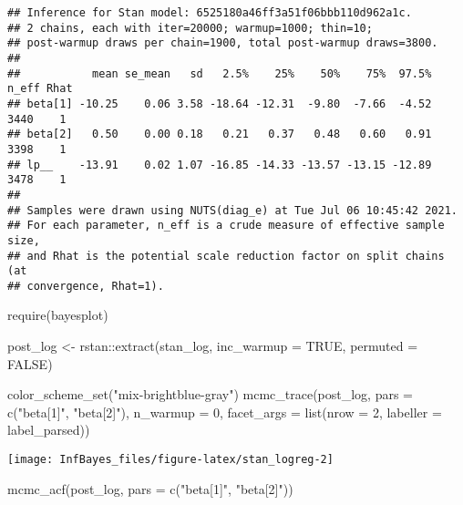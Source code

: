 \documentclass[
]{book}
\newenvironment{Shaded}{\begin{snugshade}}{\end{snugshade}}
\newcommand{\AttributeTok}[1]{\textcolor[rgb]{0.77,0.63,0.00}{#1}}
\newcommand{\ConstantTok}[1]{\textcolor[rgb]{0.00,0.00,0.00}{#1}}
\newcommand{\DecValTok}[1]{\textcolor[rgb]{0.00,0.00,0.81}{#1}}
\newcommand{\FunctionTok}[1]{\textcolor[rgb]{0.00,0.00,0.00}{#1}}
\newcommand{\NormalTok}[1]{#1}
\newcommand{\OtherTok}[1]{\textcolor[rgb]{0.56,0.35,0.01}{#1}}
\newcommand{\SpecialCharTok}[1]{\textcolor[rgb]{0.00,0.00,0.00}{#1}}
\newcommand{\StringTok}[1]{\textcolor[rgb]{0.31,0.60,0.02}{#1}}
\begin{document}
\begin{verbatim}
## Inference for Stan model: 6525180a46ff3a51f06bbb110d962a1c.
## 2 chains, each with iter=20000; warmup=1000; thin=10; 
## post-warmup draws per chain=1900, total post-warmup draws=3800.
## 
##           mean se_mean   sd   2.5%    25%    50%    75%  97.5% n_eff Rhat
## beta[1] -10.25    0.06 3.58 -18.64 -12.31  -9.80  -7.66  -4.52  3440    1
## beta[2]   0.50    0.00 0.18   0.21   0.37   0.48   0.60   0.91  3398    1
## lp__    -13.91    0.02 1.07 -16.85 -14.33 -13.57 -13.15 -12.89  3478    1
## 
## Samples were drawn using NUTS(diag_e) at Tue Jul 06 10:45:42 2021.
## For each parameter, n_eff is a crude measure of effective sample size,
## and Rhat is the potential scale reduction factor on split chains (at 
## convergence, Rhat=1).
\end{verbatim}

\begin{Shaded}
\begin{Highlighting}[]
\FunctionTok{require}\NormalTok{(bayesplot)}

\NormalTok{post\_log }\OtherTok{\textless{}{-}}\NormalTok{ rstan}\SpecialCharTok{::}\FunctionTok{extract}\NormalTok{(stan\_log, }\AttributeTok{inc\_warmup =} \ConstantTok{TRUE}\NormalTok{, }\AttributeTok{permuted =} \ConstantTok{FALSE}\NormalTok{)}


\FunctionTok{color\_scheme\_set}\NormalTok{(}\StringTok{"mix{-}brightblue{-}gray"}\NormalTok{)}
\FunctionTok{mcmc\_trace}\NormalTok{(post\_log,  }\AttributeTok{pars =} \FunctionTok{c}\NormalTok{(}\StringTok{"beta[1]"}\NormalTok{, }\StringTok{"beta[2]"}\NormalTok{), }\AttributeTok{n\_warmup =} \DecValTok{0}\NormalTok{,}
                \AttributeTok{facet\_args =} \FunctionTok{list}\NormalTok{(}\AttributeTok{nrow =} \DecValTok{2}\NormalTok{, }\AttributeTok{labeller =}\NormalTok{ label\_parsed))}
\end{Highlighting}
\end{Shaded}

\begin{center}\texttt{[image: InfBayes\_files/figure-latex/stan\_logreg-2]} \end{center}

\begin{Shaded}
\begin{Highlighting}[]
\FunctionTok{mcmc\_acf}\NormalTok{(post\_log, }\AttributeTok{pars =} \FunctionTok{c}\NormalTok{(}\StringTok{"beta[1]"}\NormalTok{, }\StringTok{"beta[2]"}\NormalTok{))}
\end{Highlighting}
\end{Shaded}
\end{document}
